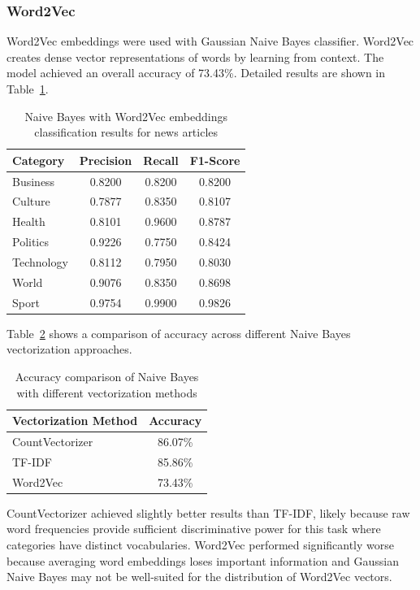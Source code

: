 \documentclass[12pt,a4paper]{article}
\begin{document}
\subsubsection{Word2Vec}

Word2Vec embeddings were used with Gaussian Naive Bayes classifier. Word2Vec creates dense vector representations of words by learning from context. The model achieved an overall accuracy of 73.43\%. Detailed results are shown in Table~\ref{tab:news_nb_w2v}.

\begin{table}[h]
\centering
\begin{tabular}{lccc}
\toprule
Category & Precision & Recall & F1-Score \\
\midrule
Business & 0.8200 & 0.8200 & 0.8200 \\
Culture & 0.7877 & 0.8350 & 0.8107 \\
Health & 0.8101 & 0.9600 & 0.8787 \\
Politics & 0.9226 & 0.7750 & 0.8424 \\
Technology & 0.8112 & 0.7950 & 0.8030 \\
World & 0.9076 & 0.8350 & 0.8698 \\
Sport & 0.9754 & 0.9900 & 0.9826 \\
\bottomrule
\end{tabular}
\caption{Naive Bayes with Word2Vec embeddings classification results for news articles}
\label{tab:news_nb_w2v}
\end{table}

Table~\ref{tab:news_nb_comparison} shows a comparison of accuracy across different Naive Bayes vectorization approaches.

\begin{table}[h]
\centering
\begin{tabular}{lc}
\toprule
Vectorization Method & Accuracy \\
\midrule
CountVectorizer & 86.07\% \\
TF-IDF & 85.86\% \\
Word2Vec & 73.43\% \\
\bottomrule
\end{tabular}
\caption{Accuracy comparison of Naive Bayes with different vectorization methods}
\label{tab:news_nb_comparison}
\end{table}

CountVectorizer achieved slightly better results than TF-IDF, likely because raw word frequencies provide sufficient discriminative power for this task where categories have distinct vocabularies. Word2Vec performed significantly worse because averaging word embeddings loses important information and Gaussian Naive Bayes may not be well-suited for the distribution of Word2Vec vectors.
\end{document}
